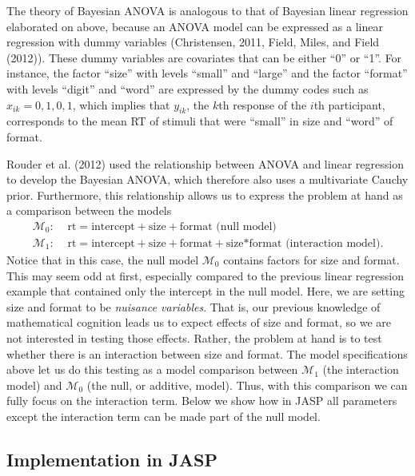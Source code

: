 \documentclass[english,,doc,floatsintext]{apa6}
\begin{document}
The theory of Bayesian ANOVA is analogous to that of Bayesian linear regression elaborated on above, because an ANOVA model can be expressed as a linear regression with dummy variables (Christensen, 2011, Field, Miles, and Field (2012)). These dummy variables are covariates that can be either \enquote{0} or \enquote{1}. For instance, the factor \enquote{size} with levels \enquote{small} and \enquote{large} and the factor \enquote{format} with levels \enquote{digit} and \enquote{word} are expressed by the dummy codes such as \(x_{ik} = 0, 1, 0, 1\), which implies that \(y_{ik}\), the \(k\)th response of the \(i\)th participant, corresponds to the mean RT of stimuli that were \enquote{small} in size and \enquote{word} of format.

Rouder et al. (2012) used the relationship between ANOVA and linear regression to develop the Bayesian ANOVA, which therefore also uses a multivariate Cauchy prior. Furthermore, this relationship allows us to express the problem at hand as a comparison between the models
\begin{align*}
  \mathcal{M}_{0}: & \text{ rt} = \text{intercept} + \text{size}+\text{format} \text{ (null model)}\\
  \mathcal{M}_{1}: & \text{ rt} = \text{intercept} + \text{size}+\text{format}+\text{size*format} \text{ (interaction model)}. 
\end{align*}
Notice that in this case, the null model \(\mathcal{M}_0\) contains factors for size and format. This may seem odd at first, especially compared to the previous linear regression example that contained only the intercept in the null model. Here, we are setting size and format to be \emph{nuisance variables}. That is, our previous knowledge of mathematical cognition leads us to expect effects of size and format, so we are not interested in testing those effects. Rather, the problem at hand is to test whether there is an interaction between size and format. The model specifications above let us do this testing as a model comparison between \(\mathcal{M}_1\) (the interaction model) and \(\mathcal{M}_0\) (the null, or additive, model). Thus, with this comparison we can fully focus on the interaction term. Below we show how in JASP all parameters except the interaction term can be made part of the null model.

\hypertarget{implementation-in-jasp}{%
\subsection{Implementation in JASP}\label{implementation-in-jasp}}
\end{document}
